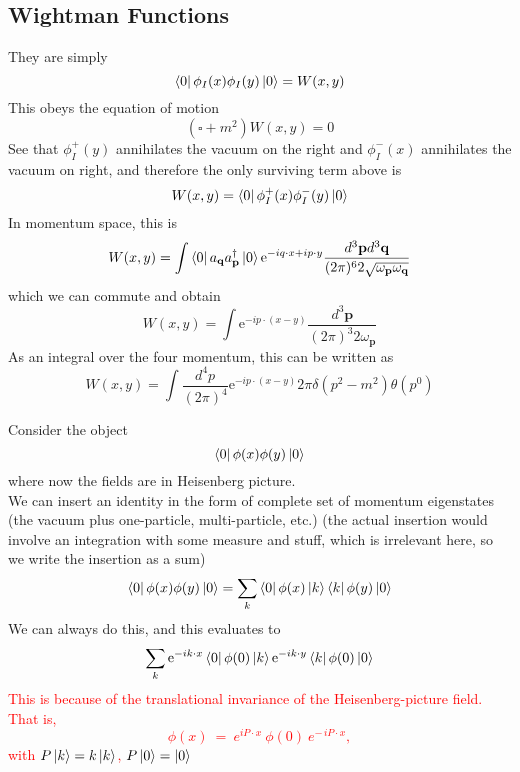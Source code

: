 \documentclass[11pt, notitlepage]{report}
\newcommand{\e}{\mathrm{e}}
\newcommand{\w}{\omega}
\renewcommand{\a}[1]{a_\mathbf{#1}}
\newcommand{\adag}[1]{a^\dagger_\mathbf{#1}}
\numberwithin{equation}{section}
\begin{document}
    \subsection{Wightman Functions}
    They are simply 
    \begin{equation*}
        \bra{0}\phi_I(x)\phi_I(y)\ket{0} = W(x,y)
    \end{equation*}
    This obeys the equation of motion 
    \begin{equation*}
        (\square + m^2) W(x,y) = 0
    \end{equation*}
    See that \(\phi_I^+(y)\) annihilates the vacuum on the right and \(\phi_I^-(x)\) annihilates the vacuum on right, and therefore the only surviving term above is 
    \begin{equation*}
        W(x,y) = \bra{0} \phi_I^+(x)\phi_I^-(y) \ket{0}
    \end{equation*}
    In momentum space, this is 
    \begin{equation*}
        W(x,y) = \int \bra{0} \a{q}\adag{p} \ket{0} \e^{-iq\cdot x + ip\cdot y} \frac{d^3\textbf{p} d^3\textbf{q}}{(2\pi)^6 2\sqrt{\w_\textbf{p} \w_\textbf{q}}}
    \end{equation*}
    which we can commute and obtain 
    \begin{equation*}
        W(x,y) = \int \e^{-ip\cdot (x - y)} \frac{d^3\textbf{p}}{(2\pi)^3 2\w_\textbf{p}}
    \end{equation*}
    As an integral over the four momentum, this can be written as 
    \begin{equation*}
        W(x,y) = \int \frac{d^4p}{(2\pi)^4} \e^{-ip\cdot (x-y)} 2\pi \delta(p^2 - m^2) \theta(p^0)
    \end{equation*}

    Consider the object 
    \begin{equation*}
        \bra{0} \phi(x)\phi(y) \ket{0}
    \end{equation*}
    where now the fields are in Heisenberg picture. \\
    We can insert an identity in the form of complete set of momentum eigenstates (the vacuum plus one-particle, multi-particle, etc.) (the actual insertion would involve an integration with some measure and stuff, which is irrelevant here, so we write the insertion as a sum)
    \begin{equation*}
        \bra{0} \phi(x)\phi(y) \ket{0} = \sum_k \bra{0} \phi(x) \ket{k}\bra{k}\phi(y) \ket{0}
    \end{equation*}
    We can always do this, and this evaluates to 
    \begin{equation*}
        \sum_k \e^{-ik\cdot x}  \bra{0} \phi(0) \ket{k} \e^{-ik\cdot y}   \bra{k}\phi(0) \ket{0}
    \end{equation*}
    \textcolor{red}{
        This is because of the translational invariance of the Heisenberg-picture field. That is, 
        \begin{equation*}
            \phi(x)~=~e^{i P\cdot x}\:\phi(0)\:e^{-\,i P\cdot x},
        \end{equation*}
        with \(P\ket{k} = k\ket{k}\), \(P\ket{0} = \ket{0}\)\\
    }
\end{document}
